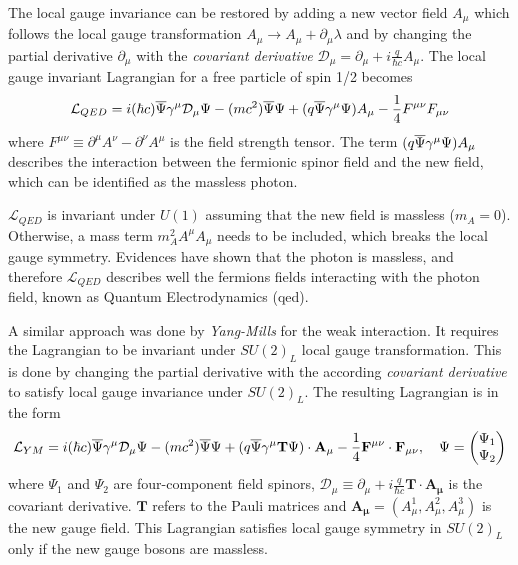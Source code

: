 The local gauge invariance can be restored by adding a new vector field $A_{\mu}$ which follows the local gauge transformation $A_{\mu} \rightarrow A_{\mu} + \partial_{\mu}\lambda$ and by changing the partial derivative $\partial_{\mu}$ with the \textit{covariant derivative} $\mathcal{D}_{\mu} = \partial_{\mu} + i\frac{q}{\hbar c}A_{\mu}$. The local gauge invariant Lagrangian for a free particle of spin 1/2 becomes \cite{Griffiths:343277}
\begin{equation}
  \mathcal{L}_{QED} = i(\hbar c)\overline{\rm \Psi}\gamma^{\mu}\mathcal{D}_{\mu}\Psi - (mc^2)\overline{\rm \Psi}\Psi + (q\overline{\rm \Psi}\gamma^{\mu}\Psi)A_{\mu} - \frac{1}{4}F^{\mu\nu}F_{\mu\nu}
\end{equation}
where $F^{\mu\nu} \equiv \partial^{\mu}A^{\nu} - \partial^{\nu}A^{\mu}$ is the field strength tensor. The term $(q\overline{\rm \Psi}\gamma^{\mu}\Psi)A_{\mu}$ describes the interaction between the fermionic spinor field and the new field, which can be identified as the massless photon.

$\mathcal{L}_{QED}$ is invariant under $U(1)$ assuming that the new field is massless ($m_{A} = 0$). Otherwise, a mass term $m_{A}^2A^{\mu}A_{\mu}$ needs to be included, which breaks the local gauge symmetry. Evidences \cite{Lakes:1998mi, Chibisov:1976mm, Williams:1971ms} have shown that the photon is massless, and therefore $\mathcal{L}_{QED}$ describes well the fermions fields interacting with the photon field, known as Quantum Electrodynamics (\acrshort{qed}).

A similar approach was done by \textit{Yang-Mills} for the weak interaction. It requires the Lagrangian to be invariant under $SU(2)_{L}$ local gauge transformation. This is done by changing the partial derivative with the according \textit{covariant derivative} to satisfy local gauge invariance under $SU(2)_{L}$. The resulting Lagrangian is in the form \cite{Griffiths:343277}
\begin{equation}
  \mathcal{L}_{YM} = i(\hbar c)\overline{\rm \Psi}\gamma^{\mu}\mathcal{D}_{\mu}\Psi - (mc^2)\overline{\rm \Psi}\Psi + (q\overline{\rm \Psi}\gamma^{\mu}\mathbf{T}\Psi) \cdot \mathbf{A_{\mu}} - \frac{1}{4}\mathbf{F^{\mu\nu}} \cdot \mathbf{F_{\mu\nu}}, \quad \Psi = \begin{pmatrix} \Psi_1 \\ \Psi_2 \end{pmatrix}
\end{equation}
where $\Psi_1$ and $\Psi_2$ are four-component field spinors, $\mathcal{D}_{\mu} \equiv \partial_{\mu} + i\frac{q}{\hbar c}\mathbf{T} \cdot \mathbf{A_{\mu}}$ is the covariant derivative. $\mathbf{T}$ refers to the Pauli matrices and $\mathbf{A_{\mu}} = (A_{\mu}^1, A_{\mu}^2, A_{\mu}^3)$ is the new gauge field. This Lagrangian satisfies local gauge symmetry in $SU(2)_{L}$ only if the new gauge bosons are massless.

